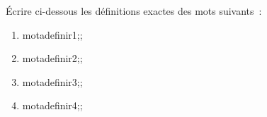 \documentclass[exercice]{thedocument}%
\begin{document}
%
Écrire ci-dessous les définitions exactes des mots suivants~:
\begin{enumerate}
    \item \<motadefinir1;;\dotedline\dotedline
    \item \<motadefinir2;;\dotedline\dotedline
    \item \<motadefinir3;;\dotedline\dotedline
    \item \<motadefinir4;;\dotedline\dotedline
\end{enumerate}
\end{document}
